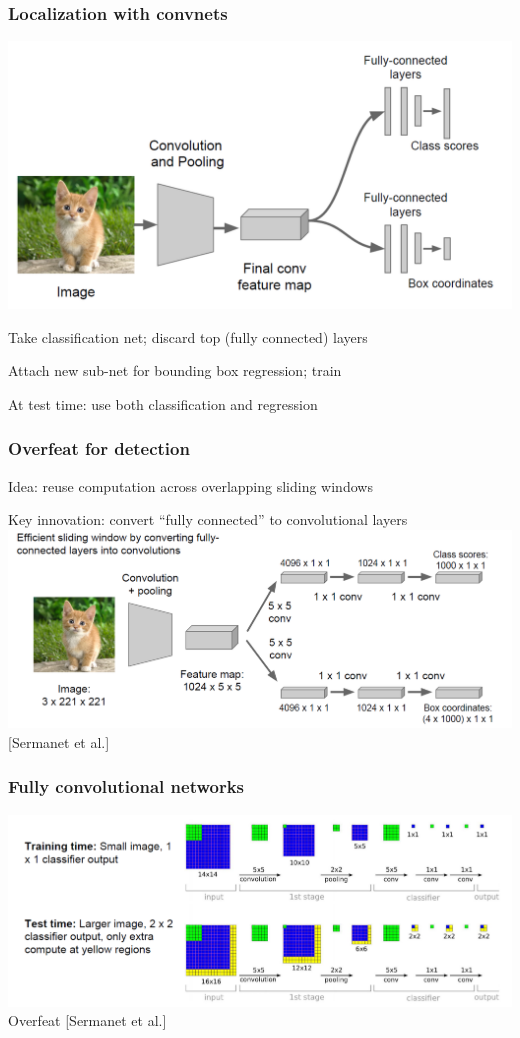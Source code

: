\documentclass[xcolor=dvipsnames]{beamer}
\begin{document}
\begin{frame}
  \frametitle{Localization with convnets}
  \includegraphics[width=.8\textwidth]{ak-localization-net}\raisebox{1em}{[A. Karpathy]}
\bi
\item Take classification net; discard top (fully connected) layers
\item Attach new sub-net for bounding box regression; train
\item At test time: use both classification and regression
\ei
\end{frame}

\begin{frame}
  \frametitle{Overfeat for detection}
\bi
\item Idea: reuse computation across overlapping sliding windows
\item Key innovation: convert ``fully connected'' to
  convolutional layers
\includegraphics[width=.8\textwidth]{ak-overfeat-fc}\\
{[Sermanet et al.]}
\ei
\end{frame}

\begin{frame}
  \frametitle{Fully convolutional networks}
  \includegraphics[width=.95\textwidth]{ak-overfeat-computation}\\
Overfeat [Sermanet et al.]
\end{frame}
\end{document}
